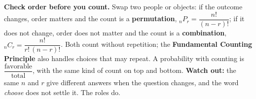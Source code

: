 \documentclass[12pt]{article}
\begin{document}
\vspace{0.12in}

\begin{remindbox}
\small
\textbf{Check order before you count.} Swap two people or objects: if the outcome changes, order
matters and the count is a \textbf{permutation}, $_nP_r = \dfrac{n!}{(n-r)!}$; if it does not
change, order does not matter and the count is a \textbf{combination},
$_nC_r = \dfrac{n!}{r!\,(n-r)!}$. Both count without repetition; the \textbf{Fundamental Counting
Principle} also handles choices that may repeat. A probability with counting is
$\dfrac{\text{favorable}}{\text{total}}$, with the same kind of count on top and bottom.
\textbf{Watch out:} the same $n$ and $r$ give different answers when the question changes, and
the word \emph{choose} does not settle it. The roles do.
\end{remindbox}
\end{document}
